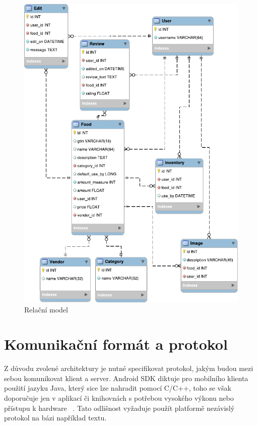 \documentclass[thesis=B,czech]{FITthesis}[2013/10/20]
\begin{document}
\begin{figure}[H]
  \centering
  \includegraphics[scale=1.20]{diagrams/relational_model}
  \caption{Relační model}
  \label{fig:RelationalModel}
\end{figure}


\section{Komunikační formát a protokol}

Z důvodu zvolené architektury je nutné specifikovat protokol, jakým budou mezi sebou komunikovat klient a server. Android SDK diktuje pro mobilního klienta použití jazyku Java, který sice lze nahradit pomocí C/C++, toho se však doporučuje jen v aplikací či knihovnách s potřebou vysokého výkonu nebo přístupu k hardware ~\cite{android_ndk}. Tato odlišnost vyžaduje použít platformě nezávislý protokol na bázi například textu.
\end{document}
